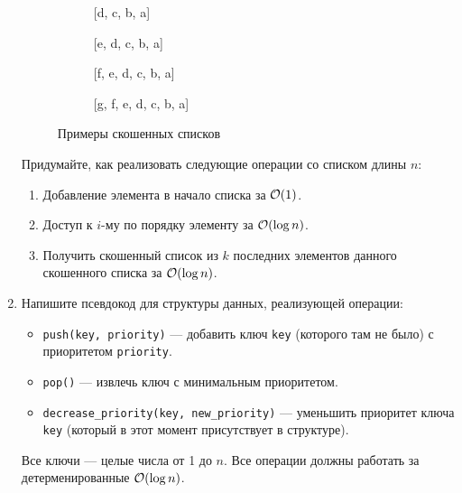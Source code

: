 \begin{enumerate}
\begin{figure}[H]
\begin{subfigure}[b]{0.2\textwidth}
\begin{tikzpicture}
        \end{tikzpicture}
        \caption{[d, c, b, a]}
      \end{subfigure}
      \vfill
      \begin{subfigure}[b]{0.3\textwidth}
        \centering
        \caption{[e, d, c, b, a]}
      \end{subfigure}
      \hfill
      \begin{subfigure}[b]{0.3\textwidth}
        \centering
        \caption{[f, e, d, c, b, a]}
      \end{subfigure}
      \hfill
      \begin{subfigure}[b]{0.3\textwidth}
        \centering
        \caption{[g, f, e, d, c, b, a]}
      \end{subfigure}
      \caption{Примеры скошенных списков}
    \end{figure}

    Придумайте, как реализовать следующие операции со списком длины
    $n$:
    \begin{enumerate}
      \item Добавление элемента в начало списка за $\O(1)$.
      \item Доступ к $i$-му по порядку элементу за $\O(\log{n})$.
      \item Получить скошенный список из $k$ последних элементов данного скошенного списка за $\O(\log{n})$.
    \end{enumerate}

  \item
    Напишите псевдокод для структуры данных, реализующей операции:
    \begin{itemize}
      \item \texttt{push(key, priority)} --- добавить ключ \texttt{key} (которого там не было) с приоритетом \texttt{priority}.
      \item \texttt{pop()} --- извлечь ключ с минимальным приоритетом.
      \item \texttt{decrease\_priority(key, new\_priority)} --- уменьшить приоритет ключа \texttt{key} (который в этот момент присутствует в структуре).
    \end{itemize}
    Все ключи --- целые числа от 1 до $n$. Все операции должны работать за детерменированные $\O(\log{n})$.


\end{enumerate}
